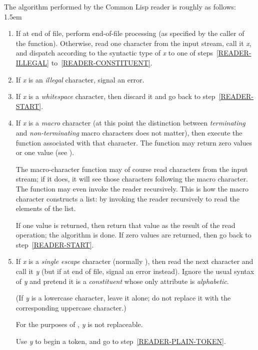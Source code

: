 The algorithm performed by the Common Lisp reader is roughly as follows:
\begingroup\leftmargini 1.5em
\begin{enumerate}
\item
If at end of file, perform end-of-file processing (as specified
by the caller of the  function).
Otherwise,
read one character from the input stream, call it \emph{x}, and
dispatch according to the syntactic type of \emph{x} to one
of steps~\ref{READER-ILLEGAL} to~\ref{READER-CONSTITUENT}.
\label{READER-START}

\item
If \emph{x} is an \emph{illegal} character, signal an error.
\label{READER-ILLEGAL}

\item
If \emph{x} is a \emph{whitespace} character,
then discard it and go back to step~\ref{READER-START}.
\label{READER-WHITESPACE}

\item
If \emph{x} is a \emph{macro} character (at this point the
distinction between \emph{terminating} and \emph{non-terminating} macro characters
does not matter), then execute the function associated
with that character.  The function may return zero values or one value
(see ).

The macro-character function may of course read characters from the input
stream; if it does, it will see those characters following the macro
character.  The function may even invoke the reader recursively.
This is how the macro character \cd{(} constructs a list:
by invoking the reader recursively to read the elements of the list.

If one value is returned, then return that value as the result of the
read operation; the algorithm is done.
If zero values are returned, then go back to step~\ref{READER-START}.

\item
If \emph{x} is a \emph{single escape} character (normally \cd{{\Xbackslash}}),
then read the next character and call it \emph{y}
(but if at end of file, signal an error instead).
Ignore the usual syntax of \emph{y}
and pretend it is a \emph{constituent} whose only attribute is
\emph{alphabetic}.
\begin{obsolete}
(If \emph{y} is a lowercase character, leave it alone;
do not replace it with the corresponding uppercase character.)
\end{obsolete}
\begin{newer}
For the purposes of , \emph{y} is not replaceable.
\end{newer}
Use \emph{y} to begin a token, and go to step~\ref{READER-PLAIN-TOKEN}.


\end{enumerate}
